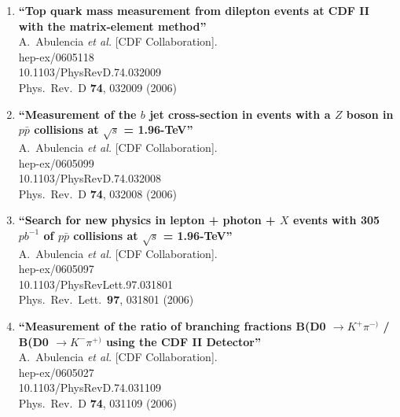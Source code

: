 \documentclass{article}
\begin{document}
\begin{enumerate}
\item%
{\bf ``Top quark mass measurement from dilepton events at CDF II with the matrix-element method''}
  \\{}A.~Abulencia {\it et al.}  [CDF Collaboration].
  \\{}hep-ex/0605118
    \\{}10.1103/PhysRevD.74.032009
\\{}Phys.\ Rev.\ D {\bf 74}, 032009 (2006) %


\item%
{\bf ``Measurement of the $b$ jet cross-section in events with a $Z$ boson in $p \bar{p}$ collisions at $\sqrt{s}$ = 1.96-TeV''}
  \\{}A.~Abulencia {\it et al.}  [CDF Collaboration].
  \\{}hep-ex/0605099
    \\{}10.1103/PhysRevD.74.032008
\\{}Phys.\ Rev.\ D {\bf 74}, 032008 (2006) %


\item%
{\bf ``Search for new physics in lepton + photon + $X$ events with 305 $pb^{-1}$ of $p \bar{p}$ collisions at $\sqrt{s}$ = 1.96-TeV''}
  \\{}A.~Abulencia {\it et al.}  [CDF Collaboration].
  \\{}hep-ex/0605097
    \\{}10.1103/PhysRevLett.97.031801
\\{}Phys.\ Rev.\ Lett.\  {\bf 97}, 031801 (2006) %


\item%
{\bf ``Measurement of the ratio of branching fractions B(D0 $\to K^{+} \pi^{-)}$ / B(D0 $\to K^{-} \pi^{+)}$ using the CDF II Detector''}
  \\{}A.~Abulencia {\it et al.}  [CDF Collaboration].
  \\{}hep-ex/0605027
    \\{}10.1103/PhysRevD.74.031109
\\{}Phys.\ Rev.\ D {\bf 74}, 031109 (2006) %



\end{enumerate}
\end{document}
